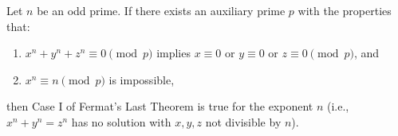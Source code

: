 Let $n$ be an odd prime. If there exists an auxiliary prime $p$ with the properties that:
\begin{enumerate}
\item $x^n + y^n + z^n \equiv 0 \pmod{p}$ implies $x \equiv 0$ or $y \equiv 0$ or $z \equiv 0 \pmod{p}$, and
\item $x^n \equiv n \pmod{p}$ is impossible,
\end{enumerate}
then Case I of Fermat's Last Theorem is true for the exponent $n$ (i.e., $x^n + y^n = z^n$ has no solution with $x, y, z$ not divisible by $n$).
